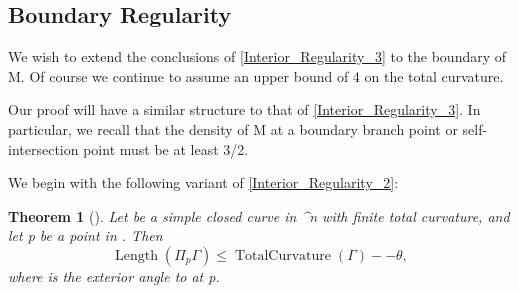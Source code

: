 \documentclass[a4paper, 11pt]{article}
\theoremstyle{plain}
\newtheorem{theorem}{Theorem}[section]
\theoremstyle{definition}
\theoremstyle{remark}
\numberwithin{equation}{subsection}
\def\({}
\def\){}
\def\pi{}
\begin{document}
\subsection{Boundary Regularity}

We wish to extend the conclusions of \cref{Interior_Regularity_3} to the boundary of \(M\). Of course we continue to assume an upper bound of \(4\pi\) on the total curvature.

Our proof will have a similar structure to that of \cref{Interior_Regularity_3}. In particular, we recall that the density of \(M\) at a boundary branch point or self-intersection point must be at least \(3/2\).

We begin with the following variant of \cref{Interior_Regularity_2}:

\begin{theorem}[{\cite[Theorem 3.1]{EWW02}}]
\label{Boundary_Regularity_1}
Let \(\Gamma\) be a simple closed curve in \(^{n}\) with finite total curvature, and let \(p\) be a point in \(\Gamma\). Then
\begin{equation}
\operatorname{Length}(\Pi_{p}\Gamma) \leqslant \operatorname{TotalCurvature}(\Gamma) - \pi - \theta,
\end{equation}
where \(\theta\) is the exterior angle to \(\Gamma\) at \(p\).
\end{theorem}
\end{document}

